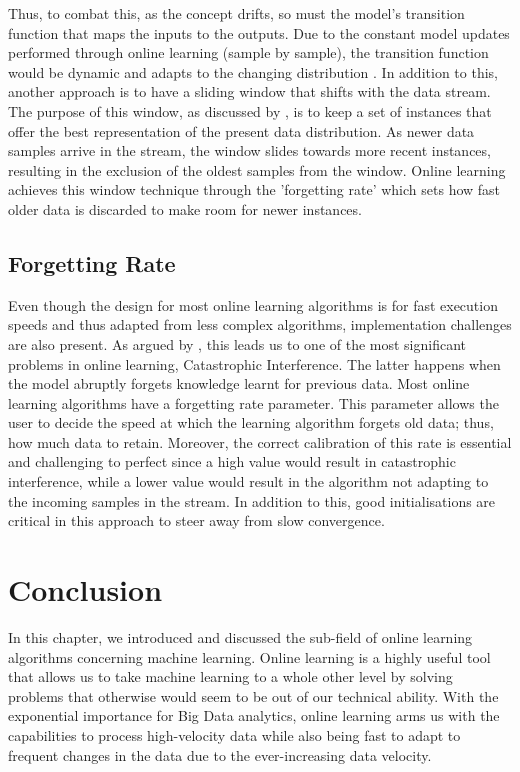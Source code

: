 Thus, to combat this, as the concept drifts, so must the model's transition function that maps the inputs to the outputs. Due to the constant model updates performed through online learning (sample by sample), the transition function would be dynamic and adapts to the changing distribution \citep{Gama2014ASO, hoi_online_2018, Lane:1998:AOL:3000292.3000339}. In addition to this, another approach is to have a sliding window that shifts with the data stream. The purpose of this window, as discussed by \citet{wozniak_hybrid_2011}, is to keep a set of instances that offer the best representation of the present data distribution. As newer data samples arrive in the stream, the window slides towards more recent instances, resulting in the exclusion of the oldest samples from the window. Online learning achieves this window technique through the 'forgetting rate' which sets how fast older data is discarded to make room for newer instances. 

\subsection{Forgetting Rate}

Even though the design for most online learning algorithms is for fast execution speeds and thus adapted from less complex algorithms, implementation challenges are also present. As argued by \citet{gepperth_incremental_2016}, this leads us to one of the most significant problems in online learning, Catastrophic Interference. The latter happens when the model abruptly forgets knowledge learnt for previous data. Most online learning algorithms have a forgetting rate parameter. This parameter allows the user to decide the speed at which the learning algorithm forgets old data; thus, how much data to retain. Moreover, the correct calibration of this rate is essential and challenging to perfect since a high value would result in catastrophic interference, while a lower value would result in the algorithm not adapting to the incoming samples in the stream. In addition to this, good initialisations are critical in this approach to steer away from slow convergence.

\section{Conclusion}

In this chapter, we introduced and discussed the sub-field of online learning algorithms concerning machine learning. Online learning is a highly useful tool that allows us to take machine learning to a whole other level by solving problems that otherwise would seem to be out of our technical ability. With the exponential importance for Big Data analytics, online learning arms us with the capabilities to process high-velocity data while also being fast to adapt to frequent changes in the data due to the ever-increasing data velocity.